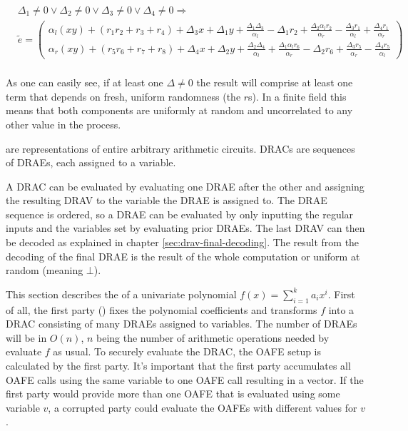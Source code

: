\begin{align*}
  &
  \Delta_1 \neq 0 \vee \Delta_2 \neq 0 \vee
  \Delta_3 \neq 0 \vee \Delta_4 \neq 0
  \Rightarrow \\
  &
  \widetilde{e} =
  \begin{pmatrix}
    \alpha_l(xy) + (r_1r_2 + r_3 + r_4)
    + \Delta_3x + \Delta_1y
    + \frac{\Delta_1\Delta_3}{\alpha_l}
    - \Delta_1r_2
    + \frac{\Delta_2\alpha_lr_2}{\alpha_r}
    - \frac{\Delta_3r_1}{\alpha_l}
    + \frac{\Delta_4r_1}{\alpha_r}
    \\
    \alpha_r(xy) + (r_5r_6 + r_7 + r_8)
    + \Delta_4x + \Delta_2y
    + \frac{\Delta_2\Delta_4}{\alpha_l}
    + \frac{\Delta_1\alpha_lr_6}{\alpha_r}
    - \Delta_2r_6
    + \frac{\Delta_3r_5}{\alpha_r}
    - \frac{\Delta_4r_5}{\alpha_l}
  \end{pmatrix} \\
\end{align*}

\noindent{}As one can easily see, if at least one $\Delta \neq 0$ the result
will comprise at least one term that depends on fresh, uniform randomness (the
$r$s). In a finite field this means that both components are uniformly at random
and uncorrelated to any other value in the process.


%
%
\label{sec:drac}

 are representations of entire
arbitrary arithmetic circuits. DRACs are sequences of DRAEs, each assigned to a
variable.

\label{sec:DRAC-eval}

A DRAC can be evaluated by evaluating one DRAE after the other and assigning the
resulting DRAV to the variable the DRAE is assigned to. The DRAE sequence is
ordered, so a DRAE can be evaluated by only inputting the regular inputs
and the variables set by evaluating prior DRAEs. The last DRAV can then be
decoded as explained in chapter \ref{sec:drav-final-decoding}. The result from
the decoding of the final DRAE is the result of the whole computation or uniform
at random (meaning $\bot$).


%
%
\label{sec:OPE}

This section describes the  of a
univariate polynomial $f(x) = \sum_{i=1}^k a_ix^i$. First of all, the first
party (\JWpOne{}) fixes the polynomial coefficients and transforms $f$ into a
DRAC consisting of many DRAEs assigned to variables. The number of DRAEs will be
in $O(n)$, $n$ being the number of arithmetic operations needed by evaluate
$f$ as usual. To securely evaluate the DRAC, the OAFE setup is calculated by
the first party. It's important that the first party accumulates all OAFE calls
using the same variable to one OAFE call resulting in a vector. If the first
party would provide more than one OAFE that is evaluated using some variable
$v$, a corrupted party could evaluate the OAFEs with different values for $v$.

